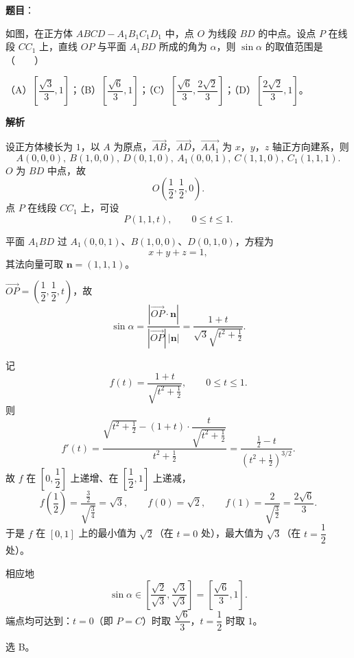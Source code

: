 \begin{answer}

\textbf{题目}：

如图，在正方体 $ABCD-A_1B_1C_1D_1$ 中，点 $O$ 为线段 $BD$ 的中点。设点 $P$ 在线段 $CC_1$ 上，直线 $OP$ 与平面 $A_1BD$ 所成的角为 $\alpha$，则 $\sin\alpha$ 的取值范围是\mbox{（　　）}

（A）$\left[\dfrac{\sqrt3}3,1\right]$；（B）$\left[\dfrac{\sqrt6}3,1\right]$；（C）$\left[\dfrac{\sqrt6}3,\dfrac{2\sqrt2}3\right]$；（D）$\left[\dfrac{2\sqrt2}3,1\right]$。
\nopagebreak[4]
\begin{center}\end{center}
\nopagebreak[4]
\textbf{解析}

设正方体棱长为 $1$，以 $A$ 为原点，$\overrightarrow{AB}$，$\overrightarrow{AD}$，$\overrightarrow{AA_1}$ 为 $x$，$y$，$z$ 轴正方向建系，则
\nopagebreak[4]
\[A(0,0,0),\ B(1,0,0),\ D(0,1,0),\ A_1(0,0,1),\ C(1,1,0),\ C_1(1,1,1).\]
$O$ 为 $BD$ 中点，故
\nopagebreak[4]
\[O\left(\frac12,\frac12,0\right).\]
点 $P$ 在线段 $CC_1$ 上，可设
\nopagebreak[4]
\[P(1,1,t),\qquad 0\leqslant t\leqslant 1 .\]

平面 $A_1BD$ 过 $A_1(0,0,1)$、$B(1,0,0)$、$D(0,1,0)$，方程为
\nopagebreak[4]
\[x+y+z=1,\]
其法向量可取 $\boldsymbol n=(1,1,1)$。

$\overrightarrow{OP}=\left(\dfrac12,\dfrac12,t\right)$，故
\nopagebreak[4]
\[\sin\alpha=\frac{|\overrightarrow{OP}\cdot\boldsymbol n|}{|\overrightarrow{OP}|\,|\boldsymbol n|}
=\frac{1+t}{\sqrt3\sqrt{t^2+\frac12}} .\]

记
\nopagebreak[4]
\[f(t)=\frac{1+t}{\sqrt{t^2+\frac12}},\qquad 0\leqslant t\leqslant 1 .\]
则
\nopagebreak[4]
\[f'(t)=\frac{\sqrt{t^2+\frac12}-(1+t)\cdot\dfrac{t}{\sqrt{t^2+\frac12}}}{t^2+\frac12}
=\frac{\frac12-t}{\left(t^2+\frac12\right)^{3/2}} .\]
故 $f$ 在 $\left[0,\dfrac12\right]$ 上递增、在 $\left[\dfrac12,1\right]$ 上递减，
\nopagebreak[4]
\[f\left(\frac12\right)=\frac{\frac32}{\sqrt{\frac34}}=\sqrt3,\qquad
f(0)=\sqrt2,\qquad
f(1)=\frac{2}{\sqrt{\frac32}}=\frac{2\sqrt6}3 .\]
于是 $f$ 在 $[0,1]$ 上的最小值为 $\sqrt2$（在 $t=0$ 处），最大值为 $\sqrt3$（在 $t=\dfrac12$ 处）。

相应地
\nopagebreak[4]
\[\sin\alpha\in\left[\frac{\sqrt2}{\sqrt3},\frac{\sqrt3}{\sqrt3}\right]
=\left[\frac{\sqrt6}3,1\right].\]
端点均可达到：$t=0$（即 $P=C$）时取 $\dfrac{\sqrt6}3$，$t=\dfrac12$ 时取 $1$。

选 B。


\end{answer}
